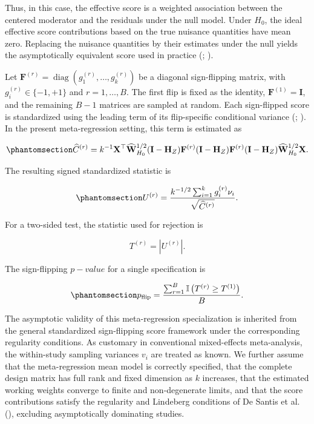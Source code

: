 \documentclass[
  man,
  longtable,
  nolmodern,
  notxfonts,
  notimes,
  colorlinks=true,linkcolor=blue,citecolor=blue,urlcolor=blue]{apa7}
\begin{document}
Thus, in this case, the effective score is a weighted association
between the centered moderator and the residuals under the null model.
Under \(H_0\), the ideal effective score contributions based on the true
nuisance quantities have mean zero. Replacing the nuisance quantities by
their estimates under the null yields the asymptotically equivalent
score used in practice (; ).

Let \(\mathbf{F}^{(r)}=\operatorname{diag}(g_1^{(r)},\ldots,g_k^{(r)})\)
be a diagonal sign-flipping matrix, with \(g_i^{(r)}\in\{-1,+1\}\) and
\(r=1,\ldots,B\). The first flip is fixed as the identity,
\(\mathbf{F}^{(1)}=\mathbf{I}\), and the remaining \(B-1\) matrices are
sampled at random. Each sign-flipped score is standardized using the
leading term of its flip-specific conditional variance
(;
). In the present
meta-regression setting, this term is estimated as

\begin{equation}\phantomsection\label{eq-flip-variance}{
\widehat{C}^{(r)}
=
k^{-1}
\mathbf{X}^{\top}
\widehat{\mathbf{W}}_{H_0}^{1/2}
(\mathbf{I}-\mathbf{H}_Z)
\mathbf{F}^{(r)}
(\mathbf{I}-\mathbf{H}_Z)
\mathbf{F}^{(r)}
(\mathbf{I}-\mathbf{H}_Z)
\widehat{\mathbf{W}}_{H_0}^{1/2}
\mathbf{X}.
}\end{equation}

The resulting signed standardized statistic is

\begin{equation}\phantomsection\label{eq-univ-score-stat}{
U^{(r)}
=
\frac{
k^{-1/2}
\sum_{i=1}^{k}
g_i^{(r)}
\nu_i
}{
\sqrt{\widehat{C}^{(r)}}
}.
}\end{equation}

For a two-sided test, the statistic used for rejection is

\[
T^{(r)}=\left|U^{(r)}\right|.
\]

The sign-flipping \(p-value\) for a single specification is

\begin{equation}\phantomsection\label{eq-flip-p}{
p_{\mathrm{flip}}
=
\frac{
\sum_{r=1}^{B}
\mathbb{I}
\left(
T^{(r)}
\geq
T^{(1)}
\right)
}{B}.
}\end{equation}

The asymptotic validity of this meta-regression specialization is
inherited from the general standardized sign-flipping score framework
under the corresponding regularity conditions. As customary in
conventional mixed-effects meta-analysis, the within-study sampling
variances \(v_i\) are treated as known. We further assume that the
meta-regression mean model is correctly specified, that the complete
design matrix has full rank and fixed dimension as \(k\) increases, that
the estimated working weights converge to finite and non-degenerate
limits, and that the score contributions satisfy the regularity and
Lindeberg conditions of De Santis et al.
(), excluding asymptotically
dominating studies.
\end{document}

